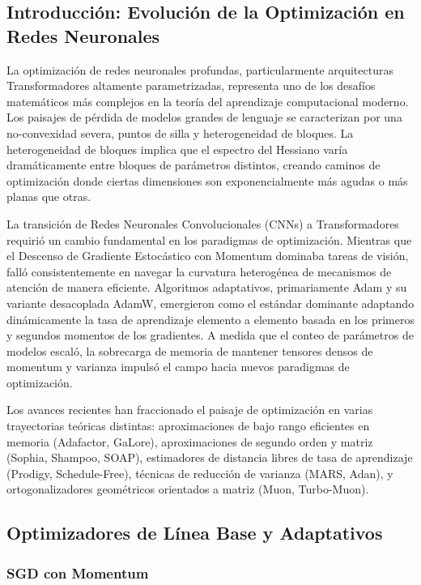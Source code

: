 \documentclass[11pt,a4paper]{article}
\begin{document}
\subsection{Introducción: Evolución de la Optimización en Redes Neuronales}

La optimización de redes neuronales profundas, particularmente arquitecturas Transformadores altamente parametrizadas, representa uno de los desafíos matemáticos más complejos en la teoría del aprendizaje computacional moderno. Los paisajes de pérdida de modelos grandes de lenguaje se caracterizan por una no-convexidad severa, puntos de silla y heterogeneidad de bloques. La heterogeneidad de bloques implica que el espectro del Hessiano varía dramáticamente entre bloques de parámetros distintos, creando caminos de optimización donde ciertas dimensiones son exponencialmente más agudas o más planas que otras.

La transición de Redes Neuronales Convolucionales (CNNs) a Transformadores requirió un cambio fundamental en los paradigmas de optimización. Mientras que el Descenso de Gradiente Estocástico con Momentum dominaba tareas de visión, falló consistentemente en navegar la curvatura heterogénea de mecanismos de atención de manera eficiente. Algoritmos adaptativos, primariamente Adam y su variante desacoplada AdamW, emergieron como el estándar dominante adaptando dinámicamente la tasa de aprendizaje elemento a elemento basada en los primeros y segundos momentos de los gradientes. A medida que el conteo de parámetros de modelos escaló, la sobrecarga de memoria de mantener tensores densos de momentum y varianza impulsó el campo hacia nuevos paradigmas de optimización.

Los avances recientes han fraccionado el paisaje de optimización en varias trayectorias teóricas distintas: aproximaciones de bajo rango eficientes en memoria (Adafactor, GaLore), aproximaciones de segundo orden y matriz (Sophia, Shampoo, SOAP), estimadores de distancia libres de tasa de aprendizaje (Prodigy, Schedule-Free), técnicas de reducción de varianza (MARS, Adan), y ortogonalizadores geométricos orientados a matriz (Muon, Turbo-Muon).

\subsection{Optimizadores de Línea Base y Adaptativos}

\subsubsection{SGD con Momentum}
\end{document}
